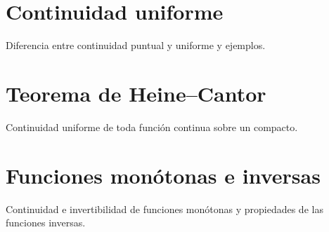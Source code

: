 \section{Continuidad uniforme}
Diferencia entre continuidad puntual y uniforme y ejemplos.

\section{Teorema de Heine--Cantor}
Continuidad uniforme de toda función continua sobre un compacto.

\section{Funciones monótonas e inversas}
Continuidad e invertibilidad de funciones monótonas y propiedades de las funciones inversas.
